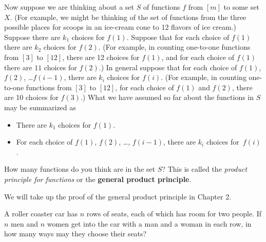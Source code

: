 \iteme Now suppose we are thinking about a set $S$ of functions $f$ 
from
$[m]$ to some set $X$.  (For example, we might be thinking of the set of
functions from the three possible places for scoops in an ice-cream cone to 12
flavors of ice cream.)  Suppose there are
$k_1$ choices for
$f(1)$.  Suppose that for each choice of $f(1)$ there are $k_2$ choices for
$f(2)$.  (For example, in counting one-to-one functions from $[3]$    
to
$[12]$, there are 12 choices for $f(1)$, and for each choice of  
$f(1)$ there are $11$ choices for $f(2)$.)  In general suppose that  
for each choice of $f(1)$, $f(2)$, \ldots $f(i-1)$, there are $k_i$
choices for
$f(i)$. (For example, in counting one-to-one functions from $[3]$ to $[12]$,
for each choice of $f(1)$ and $f(2)$, there are 10 choices for $f(3)$.)  What
we have assumed so far about the functions in $S$ may be summarized as
\begin{itemize}
\item There are $k_1$ choices for $f(1)$.
\item For each choice of $f(1)$, $f(2)$, \ldots, $f(i-1)$, there are $k_i$
choices for~$f(i)$.
\end{itemize}  How many functions do you think are in the set
$S$?\label{generalproductprinciple}      
 This is called the 
{\em product principle for functions} or the 
{\bf general product principle}. 
\ep

We will take up the proof of the general product principle in Chapter 2.


\bp
\itemi  A roller coaster car has $n$ rows of seats, each of which
has room for two people.  If $n$ men and $n$ women get into the car with a
man and a woman in each row,  in how many ways may they choose their seats?

